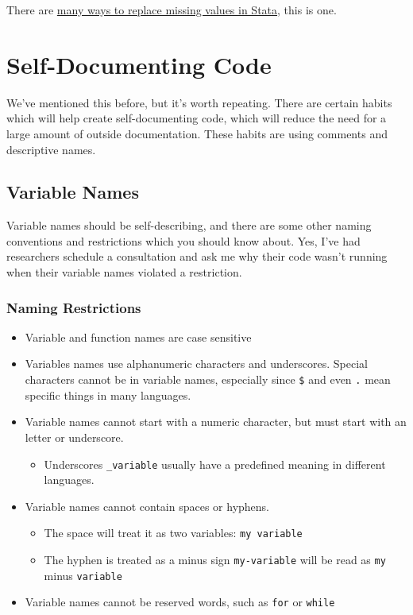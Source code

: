 \documentclass[
]{book}
\providecommand{\tightlist}{%
  \setlength{\itemsep}{0pt}\setlength{\parskip}{0pt}}
\begin{document}
There are \href{https://www.stata.com/support/faqs/data-management/replacing-missing-values/}{many ways to replace missing values in Stata}, this is one.

\chapter{Self-Documenting Code}\label{self-documenting-code}

We've mentioned this before, but it's worth repeating. There are certain habits which will help create self-documenting code, which will reduce the need for a large amount of outside documentation. These habits are using comments and descriptive names.

\section{Variable Names}\label{variable-names}

Variable names should be self-describing, and there are some other naming conventions and restrictions which you should know about. Yes, I've had researchers schedule a consultation and ask me why their code wasn't running when their variable names violated a restriction.

\subsection{Naming Restrictions}\label{naming-restrictions}

\begin{itemize}
\tightlist
\item
  Variable and function names are case sensitive
\item
  Variables names use alphanumeric characters and underscores. Special characters cannot be in variable names, especially since \texttt{\$} and even \texttt{.} mean specific things in many languages.\\
\item
  Variable names cannot start with a numeric character, but must start with an letter or underscore.

  \begin{itemize}
  \tightlist
  \item
    Underscores \texttt{\_variable} usually have a predefined meaning in different languages.
  \end{itemize}
\item
  Variable names cannot contain spaces or hyphens.

  \begin{itemize}
  \tightlist
  \item
    The space will treat it as two variables: \texttt{my\ variable}
  \item
    The hyphen is treated as a minus sign \texttt{my-variable} will be read as \texttt{my} minus \texttt{variable}
  \end{itemize}
\item
  Variable names cannot be reserved words, such as \texttt{for} or \texttt{while}
\end{itemize}
\end{document}
